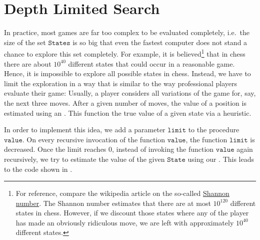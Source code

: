 \section{Depth Limited Search}
In practice, most games are far too complex to be evaluated completely, i.e.~the size of the set
$\texttt{States}$ is so big that even the fastest computer does not stand a chance to explore this set
completely.  For example, it is believed\footnote{
  For reference, compare the wikipedia article on the so-called
  \href{https://en.wikipedia.org/wiki/Shannon_number}{Shannon number}.
  The Shannon number estimates that there are at most $10^{120}$ different states in chess.  However, if we
  discount those states where any of the player has made an obviously ridiculous move, we are left with
  approximately $10^{40}$ different states.
} that in chess there are about $10^{40}$ different states that could occur in a reasonable game.
Hence, it is impossible to explore all possible states in chess.  Instead, we have to limit
the exploration in a way that is similar to the way professional players evaluate their game:  Usually, a
player considers all variations of the game for, say, the next three moves.  After a given number of moves, the
value of a position is estimated using an .  This function  the true
value of a given state via a heuristic.

In order to implement this idea, we add a parameter $\texttt{limit}$ to the procedure $\texttt{value}$.  On
every recursive invocation of the function $\texttt{value}$, the function $\texttt{limit}$ is decreased.  Once the limit reaches $0$,
instead of invoking the function $\texttt{value}$ again recursively, we try to estimate the value of
the given $\texttt{State}$ using our .  This leads to the code shown in
. 


